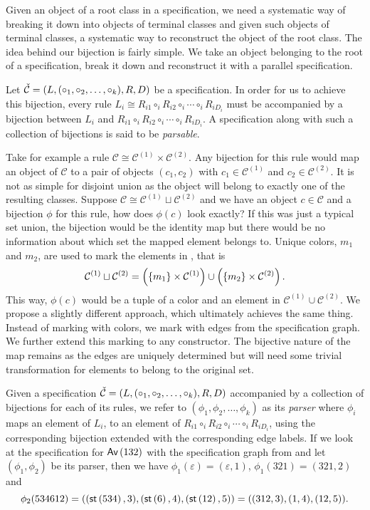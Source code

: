 \label{ch:pbijection}

Given an object of a root class in a specification, we need a systematic way of breaking it down into objects of terminal classes and given such objects of terminal classes, a systematic way to reconstruct the object of the root class. The idea behind our bijection is fairly simple. We take an object belonging to the root of a specification, break it down and reconstruct it with a parallel specification.

Let $\check{\mathcal{C}} = (L,(\circ_1,\circ_2,\dotsc,\circ_k),R,D)$ be a specification. In order for us to achieve this bijection, every rule $L_i \cong R_{i1} \circ_i R_{i2} \circ_i \dotsm \circ_i R_{iD_i}$ must be accompanied by a bijection between $L_i$ and $R_{i1} \circ_i R_{i2} \circ_i \dotsm \circ_i R_{iD_i}$. A specification along with such a collection of bijections is said to be \emph{parsable}.

Take for example a rule $\mathcal{C} \cong \mathcal{C}^{(1)} \times \mathcal{C}^{(2)}$. Any bijection for this rule would map an object of $\mathcal{C}$ to a pair of objects $(c_1,c_2)$ with $c_1 \in \mathcal{C}^{(1)}$ and $c_2 \in \mathcal{C}^{(2)}$. It is not as simple for disjoint union as the object will belong to exactly one of the resulting classes. Suppose $\mathcal{C} \cong \mathcal{C}^{(1)} \sqcup \mathcal{C}^{(2)}$ and we have an object $c\in\mathcal{C}$ and a bijection $\phi$ for this rule, how does $\phi(c)$ look exactly? If this was just a typical set union, the bijection would be the identity map but there would be no information about which set the mapped element belongs to. Unique colors, $m_1$ and $m_2$, are used to mark the elements in , that is
\[
    \mathcal{C}^{(1)} \sqcup \mathcal{C}^{(2)} = \left(\left\{m_1\right\} \times \mathcal{C}^{(1)}\right) \cup \left(\left\{m_2\right\} \times \mathcal{C}^{(2)}\right).
\]
This way, $\phi(c)$ would be a tuple of a color and an element in $\mathcal{C}^{(1)} \cup \mathcal{C}^{(2)}$. We propose a slightly different approach, which ultimately achieves the same thing. Instead of marking with colors, we mark with edges from the specification graph. We further extend this marking to any constructor. The bijective nature of the map remains as the edges are uniquely determined but will need some trivial transformation for elements to belong to the original set.

Given a specification $\check{\mathcal{C}} = (L,(\circ_1,\circ_2,\dotsc,\circ_k),R,D)$ accompanied by a collection of bijections for each of its rules, we refer to $(\phi_1,\phi_2,\dotsc,\phi_k)$ as its \emph{parser} where $\phi_i$ maps an element of $L_i$, to an element of $R_{i1} \circ_i R_{i2} \circ_i \dotsm \circ_i R_{iD_i}$, using the corresponding bijection extended with the corresponding edge labels. If we look at the specification for $\textsf{Av}\left(132\right)$ with the specification graph from  and let $(\phi_1,\phi_2)$ be its parser, then we have $\phi_1(\varepsilon) = (\varepsilon, 1)$, $\phi_1(321) = (321, 2)$ and 
\[
    \phi_2(534612) = ((\textsf{st}\left(534\right),3), (\textsf{st}\left(6\right),4), (\textsf{st}\left(12\right),5)) = ((312,3), (1,4), (12,5)).
\]

